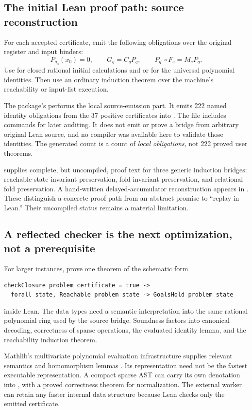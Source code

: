 \subsection{The initial Lean proof path: source reconstruction}
For each accepted certificate, emit the following obligations over the original
register and input binders:
\[
 P_{q_0}(x_0)=0,\qquad G_q=C_qP_q,\qquad
 P_{q'}\circ F_e=M_eP_q.
\]
Use  for closed rational initial calculations and
 or  for the universal polynomial identities.
Then use an ordinary induction theorem over the machine's reachability or
input-list execution.

The package's  performs the local source-emission part.
It emits 222 named identity obligations from the 37 positive certificates into
. The file includes 
commands for later auditing. It does not emit or prove a bridge from arbitrary
original Lean source, and no compiler was available here to validate those
identities. The generated count is a count of \emph{local obligations}, not
222 proved user theorems.

 supplies complete, but uncompiled, proof text for
three generic induction bridges: reachable-state invariant preservation,
fold invariant preservation, and relational fold preservation. A hand-written
delayed-accumulator reconstruction appears in .
These distinguish a concrete proof path from an abstract promise to ``replay in
Lean.'' Their uncompiled status remains a material limitation.

\subsection{A reflected checker is the next optimization, not a prerequisite}
For larger instances, prove one theorem of the schematic form
\begin{lstlisting}
checkClosure problem certificate = true ->
  forall state, Reachable problem state -> GoalsHold problem state
\end{lstlisting}
inside Lean. The data types need a semantic interpretation into the same
rational polynomial ring used by the source bridge. Soundness factors into
canonical decoding, correctness of sparse operations, the evaluated identity
lemma, and the reachability induction theorem.

Mathlib's multivariate polynomial evaluation infrastructure supplies relevant
semantics and homomorphism lemmas \cite{mvpoly}. Its representation need not
be the fastest executable representation. A compact sparse AST can carry its
own denotation into , with a proved correctness theorem for
normalization. The external worker can retain any faster internal data structure
because Lean checks only the emitted certificate.

